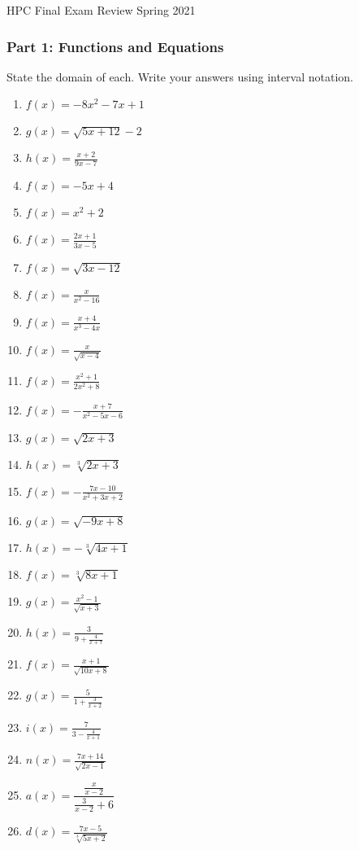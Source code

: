 \documentclass{article}
\newcounter{Review}
\begin{document}
HPC Final Exam Review Spring 2021

\subsubsection*{Part 1: Functions and Equations}

State the domain of each. Write your answers using interval notation.
\begin{multicols}{3}
\begin{enumerate}
    \item $f(x) = -8x^2 - 7x + 1$
	\item $g(x) = \sqrt{5x+12}-2$
	\item $h(x) = \frac{x+2}{9x-7}$
	\item $f(x) = -5x + 4$
	\item $f(x) = x^2 + 2$
	\item $f(x) = \frac{2x+1}{3x-5}$
	\item $f(x) = \sqrt{3x-12}$
	\item $f(x) = \frac{x}{x^2-16}$
	\item $f(x) = \frac{x+4}{x^3-4x}$
	\item $f(x) = \frac{x}{\sqrt{x-4}}$
	\item $f(x) = \frac{x^2+1}{2x^2+8}$
	\item $f(x) = -\frac{x+7}{x^2-5x-6}$
	\item $g(x) = \sqrt{2x+3}$
	\item $h(x) = \sqrt[3]{2x+3}$
	\item $f(x) = -\frac{7x-10}{x^2+3x+2}$
	\item $g(x) = \sqrt{-9x+8}$
	\item $h(x) = -\sqrt[3]{4x+1}$
	\item $f(x) = \sqrt[3]{8x+1}$
	\item $g(x) = \frac{x^2-1}{\sqrt{x+3}}$
	\item $h(x) = \frac{3}{9 + \frac{4}{x+7}}$
	\item $f(x) = \frac{x+1}{\sqrt{10x+8}}$
	\item $g(x) = \frac{5}{1+\frac{3}{x+2}}$
	\item $i(x) = \frac{7}{3-\frac{4}{x+1}}$
	\item $n(x) = \frac{7x+14}{\sqrt{2x-1}}$
	\item $a(x) = \dfrac{\frac{x}{x-2}}{{\frac{3}{x-2}+6}}$
	\item $d(x) = \frac{7x-5}{\sqrt[3]{5x+2}}$
\end{enumerate}
\end{multicols}
\setcounter{Review}{\value{enumi}}
\end{document}
